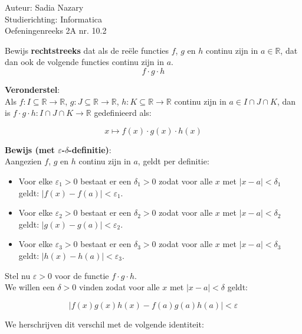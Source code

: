 \documentclass[a4paper]{article}
\begin{document}
  
\noindent \large Auteur: Sadia Nazary \\ 
\noindent \large Studierichting: Informatica \\ 
\noindent \large Oefeningenreeks 2A nr. 10.2 \\

\medskip

\normalsize
Bewijs \textbf{rechtstreeks} dat als de reële functies $f$, $g$ en $h$ continu zijn in $a \in \mathbb{R}$, dat dan ook de volgende functies continu zijn in $a$.\\

$$ f \cdot g \cdot h $$

\textbf{Veronderstel}: \\

Als $f: I \subseteq \mathbb{R} \to \mathbb{R}$,  
$g: J \subseteq \mathbb{R} \to \mathbb{R}$,  
$h: K \subseteq \mathbb{R} \to \mathbb{R}$ continu zijn in $a \in I \cap J \cap K$, dan is $f \cdot g \cdot h: I \cap J \cap K \to \mathbb{R}$ gedefinieerd als:

$$ x \mapsto f(x) \cdot g(x) \cdot h(x) $$

\textbf{Bewijs (met $\varepsilon$-$\delta$-definitie)}: \\

Aangezien $f$, $g$ en $h$ continu zijn in $a$, geldt per definitie:

\begin{itemize}
  \item Voor elke $\varepsilon_1 > 0$ bestaat er een $\delta_1 > 0$ zodat voor alle $x$ met $|x - a| < \delta_1$ geldt: $|f(x) - f(a)| < \varepsilon_1$.
  \item Voor elke $\varepsilon_2 > 0$ bestaat er een $\delta_2 > 0$ zodat voor alle $x$ met $|x - a| < \delta_2$ geldt: $|g(x) - g(a)| < \varepsilon_2$.
  \item Voor elke $\varepsilon_3 > 0$ bestaat er een $\delta_3 > 0$ zodat voor alle $x$ met $|x - a| < \delta_3$ geldt: $|h(x) - h(a)| < \varepsilon_3$.
\end{itemize}

Stel nu $\varepsilon > 0$ voor de functie $f \cdot g \cdot h$.\\

We willen een $\delta > 0$ vinden zodat voor alle $x$ met $|x - a| < \delta$ geldt:

\[
|f(x)g(x)h(x) - f(a)g(a)h(a)| < \varepsilon
\]

We herschrijven dit verschil met de volgende identiteit:
\end{document}
